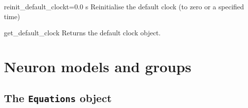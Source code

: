 \documentclass[letterpaper,10pt]{manual}
\begin{document}
\hypertarget{brian.reinit_default_clock}{}\begin{funcdesc}{reinit\_default\_clock}{t=0.0 s}
Reinitialise the default clock (to zero or a specified time)
\end{funcdesc}


\hypertarget{brian.get_default_clock}{}\begin{funcdesc}{get\_default\_clock}{}
Returns the default clock object.
\end{funcdesc}

\resetcurrentobjects
{}

\hypertarget{index-73}{}\section{Neuron models and groups}

\hypertarget{index-74}{}\subsection{The \texttt{Equations} object}
\end{document}
